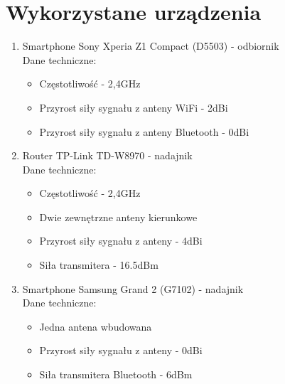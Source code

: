 \section{Wykorzystane urządzenia}
\begin{enumerate}
	\item Smartphone Sony Xperia Z1 Compact (D5503) - odbiornik\\				
	Dane techniczne:
	\begin{itemize}
		\item Częstotliwość - 2,4GHz
		\item Przyrost siły sygnału z anteny WiFi - 2dBi
		\item Przyrost siły sygnału z anteny Bluetooth - 0dBi
	\end{itemize}
	\item Router TP-Link TD-W8970 - nadajnik\\
	Dane techniczne:
	\begin{itemize}
		\item Częstotliwość - 2,4GHz
		\item Dwie zewnętrzne anteny kierunkowe
		\item Przyrost siły sygnału z anteny - 4dBi
		\item Siła transmitera - 16.5dBm					
	\end{itemize}
	\item Smartphone Samsung Grand 2 (G7102) - nadajnik\\
	Dane techniczne:
	\begin{itemize}
		\item Jedna antena wbudowana
		\item Przyrost siły sygnału z anteny - 0dBi
		\item Siła transmitera Bluetooth - 6dBm				
	\end{itemize}
\end{enumerate}
